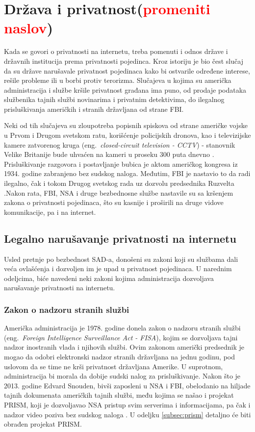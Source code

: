 \documentclass[a4paper]{article}
\newcommand\todos[1]{\textcolor{red}{#1}}
\begin{document}
\section{Država i privatnost(\todos{promeniti naslov})}	
\label{sec:drugoPoglavlje}
Kada se govori o privatnosti na internetu, treba pomenuti i odnos države i državnih institucija prema privatnosti pojedinca. Kroz istoriju je bio čest slučaj da su države narušavale privatnost pojedinaca kako bi ostvarile određene interese, rešile probleme ili u borbi protiv terorizma. Slučajeva u kojima su američka administracija i službe kršile privatnost građana ima puno, od prodaje podataka službenika tajnih službi novinarima i privatnim detektivima, do ilegalnog prisluškivanja američkih i stranih državljana od strane FBI. \par Neki od tih slučajeva su zloupotreba popisnih spiskova od strane američke vojske u Prvom i Drugom svetskom ratu, korišćenje policijskih dronova, kao i televizijske kamere zatvorenog kruga (eng.~{\em closed-circuit television - CCTV}) - stanovnik Velike Britanije bude uhvaćen na kameri u proseku 300 puta dnevno \cite{ethics, london}. Prisluškivanje razgovora i postavljanje bubica je aktom američkog kongresa iz 1934. godine zabranjeno bez sudskog naloga. Međutim, FBI je nastavio to da radi ilegalno, čak i tokom Drugog svetskog rada uz dozvolu predsednika Ruzvelta \cite{ruzvelt}.Nakon rata, FBI, NSA i druge bezbednosne službe nastavile su sa kršenjem zakona o privatnosti pojedinaca, što su kasnije i proširili na druge vidove komunikacije, pa i na internet.

\subsection{Legalno narušavanje privatnosti na internetu}
\label{subsec:zakoni}
Usled pretnje po bezbednost SAD-a, donošeni su zakoni koji su službama dali veća ovlašćenja i dozvoljen im je upad u privatnost pojedinaca. U narednim odeljcima, biće navedeni neki zakoni kojima administracija dozvoljava narušavanje privatnosti na internetu.

\subsubsection{Zakon o nadzoru stranih službi}
Američka administracija je 1978. godine donela zakon o nadzoru stranih službi (eng.~{\em Foreign Intelligence Surveillance Act - FISA}),  kojim se dozvoljava tajni nadzor inostranih vlada i njihovih službi. Ovim zakonom američki predsednik je mogao da odobri elektronski nadzor stranih državljana na jednu godinu, pod uslovom da se time ne krši privatnost državljana Amerike. U suprotnom, administracija bi morala da dobije sudski nalog za prisluškivanje. Nakon što je 2013. godine Edvard Snouden, bivši zaposleni u NSA i FBI, obelodanio na hiljade tajnih dokumenata američkih tajnih službi, među kojima se našao i projekat PRISM, koji je dozvoljavao NSA pristup svim serverima i informacijama, pa čak i nadzor video poziva bez sudskog naloga \cite{prism}. U odeljku \ref{subsec:prism} detaljno će biti obrađen projekat PRISM.
\end{document}
